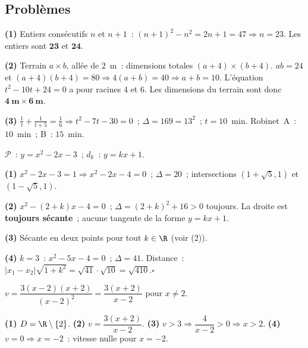 \subsection*{Probl\`emes}


\textbf{(1)} Entiers cons\'ecutifs $n$ et $n+1$~: $(n+1)^2-n^2=2n+1=47\Rightarrow n=23$.
Les entiers sont $\mathbf{23}$ et $\mathbf{24}$.

\textbf{(2)} Terrain $a\times b$, all\'ee de $2$~m~: dimensions totales $(a+4)\times(b+4)$.
$ab=24$ et $(a+4)(b+4)=80\Rightarrow4(a+b)=40\Rightarrow a+b=10$.
L'\'equation $t^2-10t+24=0$ a pour racines $4$ et $6$.
Les dimensions du terrain sont donc $\mathbf{4\ \text{m}\times6\ \text{m}}$.

\textbf{(3)} $\frac{1}{t}+\frac{1}{t+5}=\frac{1}{6}\Rightarrow t^2-7t-30=0$~;
$\Delta=169=13^2$~; $t=10$~min. Robinet~A~: $10$~min~; B~: $15$~min.


$\mathcal{P}$~: $y=x^2-2x-3$~; $d_k$~: $y=kx+1$.

\textbf{(1)} $x^2-2x-3=1\Rightarrow x^2-2x-4=0$~; $\Delta=20$~;
intersections $(1+\sqrt{5},1)$ et $(1-\sqrt{5},1)$.

\textbf{(2)} $x^2-(2+k)x-4=0$~; $\Delta=(2+k)^2+16>0$ toujours.
La droite est \textbf{toujours s\'ecante}~; aucune tangente de la forme $y=kx+1$.

\textbf{(3)} S\'ecante en deux points pour tout $k\in\R$ (voir (2)).

\textbf{(4)} $k=3$~: $x^2-5x-4=0$~; $\Delta=41$.
Distance~: $|x_1-x_2|\sqrt{1+k^2}=\sqrt{41}\cdot\sqrt{10}=\sqrt{410}$.\hfill$\square$


$v=\dfrac{3(x-2)(x+2)}{(x-2)^2}=\dfrac{3(x+2)}{x-2}$ pour $x\ne2$.

\textbf{(1)} $D=\R\setminus\{2\}$.
\textbf{(2)} $v=\dfrac{3(x+2)}{x-2}$.
\textbf{(3)} $v>3\Rightarrow\dfrac{4}{x-2}>0\Rightarrow x>2$.
\textbf{(4)} $v=0\Rightarrow x=-2$~: vitesse nulle pour $x=-2$.



